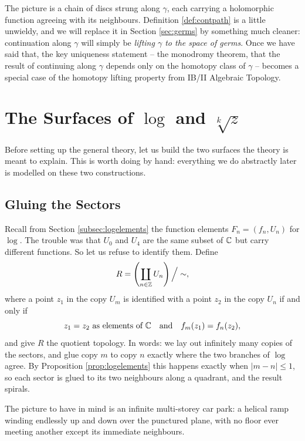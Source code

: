 \documentclass[a4paper]{scrartcl}
\begin{document}
The picture is a chain of discs strung along $\gamma$, each carrying a holomorphic
function agreeing with its neighbours. Definition \ref{def:contpath} is a little
unwieldy, and we will replace it in Section \ref{sec:germs} by something much cleaner:
continuation along $\gamma$ will simply be \emph{lifting $\gamma$ to the space of germs}.
Once we have said that, the key uniqueness statement -- the monodromy theorem, that the
result of continuing along $\gamma$ depends only on the homotopy class of $\gamma$ --
becomes a special case of the homotopy lifting property from IB/II Algebraic Topology.

\section{The Surfaces of $\log$ and $\sqrt[k]{z}$}\label{sec:logsurface}

Before setting up the general theory, let us build the two surfaces the theory is meant
to explain. This is worth doing by hand: everything we do abstractly later is modelled
on these two constructions.

\subsection{Gluing the Sectors}

Recall from Section \ref{subsec:logelements} the function elements $F_n = (f_n, U_n)$
for $\log$. The trouble was that $U_0$ and $U_4$ are the same subset of $\mathbb{C}$ but carry
different functions. So let us refuse to identify them. Define
$$
R = \left( \coprod_{n \in \mathbb{Z}} U_n \right) \Big/ \sim,
$$
where a point $z_1$ in the copy $U_m$ is identified with a point $z_2$ in the copy $U_n$
if and only if
$$
z_1 = z_2 \text{ as elements of } \mathbb{C} \quad \text{and} \quad f_m(z_1) = f_n(z_2),
$$
and give $R$ the quotient topology. In words: we lay out infinitely many copies of the
sectors, and glue copy $m$ to copy $n$ exactly where the two branches of $\log$ agree. By
Proposition \ref{prop:logelements} this happens exactly when $|m - n| \leq 1$, so each
sector is glued to its two neighbours along a quadrant, and the result spirals.

The picture to have in mind is an infinite multi-storey car park: a helical ramp winding
endlessly up and down over the punctured plane, with no floor ever meeting another except
its immediate neighbours.
\end{document}
